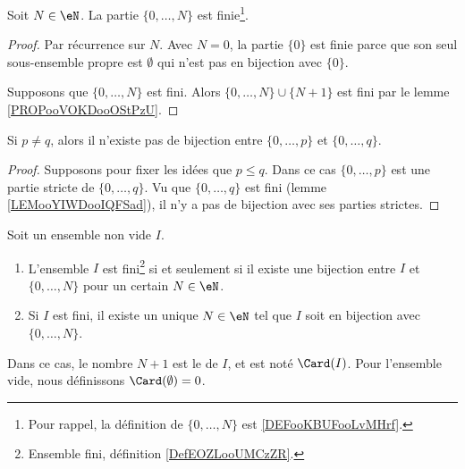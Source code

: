 \begin{lemma}       \label{LEMooYIWDooIQFSad}
	Soit \( N\in \eN\). La partie \( \{ 0,\ldots, N \}\) est finie\footnote{Pour rappel, la définition de \( \{ 0,\ldots, N \}\) est \ref{DEFooKBUFooLvMHrf}.}.
\end{lemma}

\begin{proof}
	Par récurrence sur \( N\). Avec \( N=0\), la partie \( \{ 0 \}\) est finie parce que son seul sous-ensemble propre est \( \emptyset\) qui n'est pas en bijection avec \( \{ 0 \}\).

	Supposons que \( \{ 0,\ldots, N \}\) est fini. Alors \( \{ 0,\ldots, N \}\cup \{ N+1 \}\) est fini par le lemme \ref{PROPooVOKDooOStPzU}.
\end{proof}

\begin{lemma}       \label{LEMooJDGOooHdyJnu}
	Si \( p\neq q\), alors il n'existe pas de bijection entre \( \{ 0,\ldots, p \}\) et \( \{ 0,\ldots, q \}\).
\end{lemma}

\begin{proof}
	Supposons pour fixer les idées que \( p\leq q\). Dans ce cas \( \{ 0,\ldots, p \}\) est une partie stricte de \( \{ 0,\ldots, q \}\). Vu que \( \{ 0,\ldots, q \}\) est fini (lemme \ref{LEMooYIWDooIQFSad}), il n'y a pas de bijection avec ses parties strictes.
\end{proof}

\begin{propositionDef}     \label{PROPooJLGKooDCcnWi}
	Soit un ensemble non vide \( I\).
	\begin{enumerate}
		\item   \label{ITEMooMNMTooEOIjdo}
		      L'ensemble \( I\) est fini\footnote{Ensemble fini, définition \ref{DefEOZLooUMCzZR}.} si et seulement si il existe une bijection entre \( I\) et \( \{ 0,\ldots, N \}\) pour un certain \( N\in \eN\).
		\item   \label{ITEMooZJFUooSNUSIk}
		      Si \( I\) est fini, il existe un unique \( N\in \eN\) tel que \( I\) soit en bijection avec \( \{ 0,\ldots, N \}\).
	\end{enumerate}
	Dans ce cas, le nombre \( N+1\) est le  de \( I\), et est noté \( \Card(I)\). Pour l'ensemble vide, nous définissons \( \Card(\emptyset)=0\).
\end{propositionDef}

